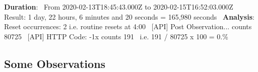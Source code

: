 \begin{DoxyEnumerate}
\begin{DoxyEnumerate}
\item {\bfseries{Duration}}\+:~\newline
 From 2020-\/02-\/13T18\+:45\+:43.\+000Z to 2020-\/02-\/15T16\+:52\+:03.\+000Z~\newline
 Result\+: 1 day, 22 hours, 6 minutes and 20 seconds = 165,980 seconds~\newline
 {\bfseries{Analysis}}\+:~\newline
 Reset occurrences\+: 2 i.\+e. routine resets at 4\+:00~\newline
 \mbox{[}A\+PI\mbox{]} Post Observation... counts 80725~\newline
 \mbox{[}A\+PI\mbox{]} H\+T\+TP Code\+: -\/1x counts 191~\newline
 i.\+e. 191 / 80725 x 100 = 0.\%~\newline

\end{DoxyEnumerate}
\end{DoxyEnumerate}\hypertarget{index_testing}{}\subsection{Some Observations}\label{index_testing}


